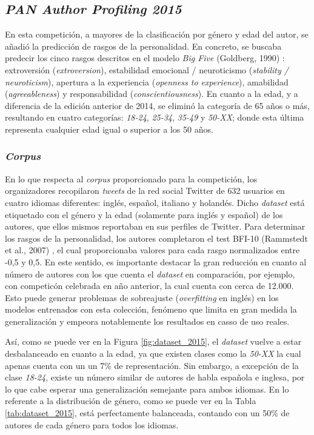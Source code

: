 \subsection{\textit{PAN Author Profiling 2015}}
\label{sec:pan_2015}

En esta competición, a mayores de la clasificación por género y edad del autor, se añadió la predicción de rasgos de la personalidad. En concreto,
se buscaba predecir los cinco rasgos descritos en el modelo \textit{Big Five} (Goldberg, 1990) \cite{goldberg1990alternative}: extroversión (\textit{extroversion}),
estabilidad emocional / neuroticismo (\textit{stability / neuroticism}), apertura a la experiencia (\textit{openness to experience}), amabilidad (\textit{agreeableness}) y
responsabilidad (\textit{conscientiousness}). En cuanto a la edad, y a diferencia de la edición anterior de 2014, se eliminó la categoría de 65 años o más,
resultando en cuatro categorías: \textit{18-24}, \textit{25-34}, \textit{35-49} y \textit{50-XX}; donde esta última representa cualquier edad igual o superior
a los 50 años.

\subsubsection{\textit{Corpus}}
\label{sec:pan_2015_corpus}

\bigskip
En lo que respecta al \textit{corpus} proporcionado para la competición, los organizadores recopilaron \textit{tweets} de la red social Twitter
de 632 usuarios en cuatro idiomas diferentes: inglés, español, italiano y holandés. Dicho \textit{dataset} está etiquetado con el género y la edad
(solamente para inglés y español) de los autores, que ellos mismos reportaban en sus perfiles de Twitter. Para determinar los rasgos de la personalidad,
los autores completaron el test BFI-10 (Rammstedt et al., 2007) \cite{rammstedt2007measuring}, el cual proporcionaba valores para cada rasgo normalizados entre -0,5 y 0,5.
En este sentido, es importante destacar la gran reducción en cuanto al número de autores con los que cuenta el \textit{dataset} en comparación, por ejemplo,
con competicón celebrada en año anterior, la cual cuenta con cerca de 12.000. Esto puede generar problemas de sobreajuste (\textit{overfitting} en inglés) en los modelos
entrenados con esta colección, fenómeno que limita en gran medida la generalización y empeora notablemente los resultados en casso de uso reales.

\bigskip
Así, como se puede ver en la Figura \ref{fig:dataset_2015}, el \textit{dataset} vuelve a estar desbalanceado en cuanto a la edad, ya que existen
clases como la \textit{50-XX} la cual apenas cuenta con un un 7\% de representación. Sin embargo,
a excepción de la clase \textit{18-24}, existe un número similar de autores de habla española e inglesa, por lo que cabe esperar una generalización
semejante para ambos idiomas. En lo referente a la distribución de género, como se puede ver en la Tabla \ref{tab:dataset_2015}, está perfectamente balanceada,
contando con un 50\% de autores de cada género para todos los idiomas.

